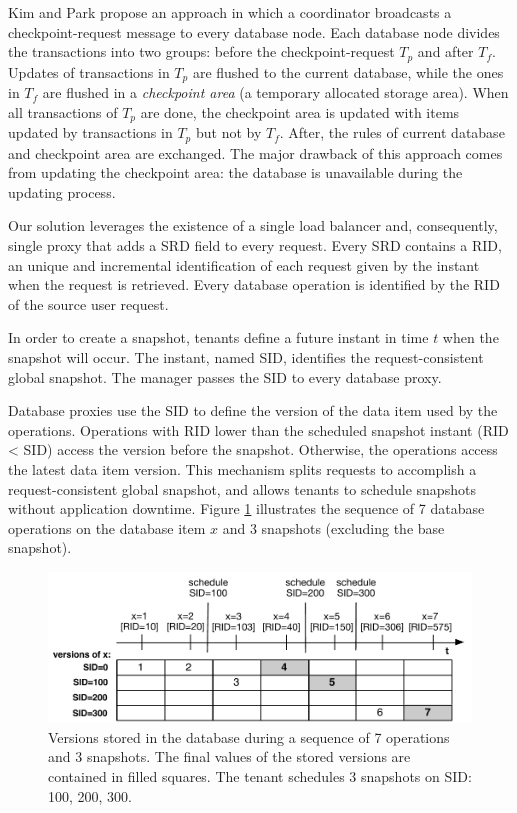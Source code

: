 Kim and Park \cite{kim_checkpoint} propose an approach in which a coordinator broadcasts a checkpoint-request message to every database node. Each database node divides the transactions into two groups: before the checkpoint-request $T_p$ and after $T_f$. Updates of transactions in $T_p$ are flushed to the current database, while the ones in $T_f$ are flushed in a \emph{checkpoint area} (a temporary allocated storage area). When all transactions of $T_p$ are done, the checkpoint area is updated with items updated by transactions in $T_p$ but not by $T_f$. After, the rules of current database and checkpoint area are exchanged. The major drawback of this approach comes from updating the checkpoint area: the database is unavailable during the updating process.


Our solution leverages the existence of a single load balancer and, consequently, single proxy that adds a \acf{SRD} field to every request. Every \ac{SRD} contains a \ac{RID}, an unique and incremental identification of each request given by the instant when the request is retrieved. Every database operation is identified by the \ac{RID} of the source user request.

In order to create a snapshot, tenants define a future instant in time $t$ when the snapshot will occur. The instant, named \acf{SID}, identifies the request-consistent global snapshot. The manager passes the \ac{SID} to every database proxy.

Database proxies use the \ac{SID} to define the version of the data item used by the operations. Operations with \acf{RID} lower than the scheduled snapshot instant (\ac{RID} < \ac{SID}) access the version before the snapshot. Otherwise, the operations access the latest data item version. This mechanism splits requests to accomplish a request-consistent global snapshot, and allows tenants to schedule snapshots without application downtime. Figure \ref{fig:snapshots} illustrates the sequence of 7 database operations on the database item $x$ and 3 snapshots (excluding the base snapshot).

\begin{figure}
\centering
  \includegraphics[width=130mm]{images/snapshots}
  \caption[Snapshot versions stored in the database]{Versions stored in the database during a sequence of 7 operations and 3 snapshots. The final values of the stored versions are contained in filled squares. The tenant schedules 3 snapshots on SID: 100, 200, 300.}
\label{fig:snapshots}
\end{figure}


